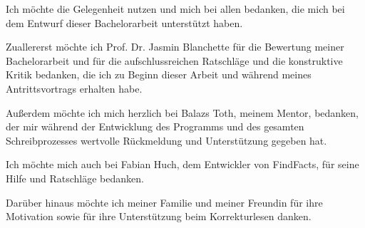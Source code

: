 \thispagestyle{empty}

\vspace*{20mm}

\begin{center}
\makeatletter

{}
{}
\makeatother
\end{center}

\vspace{10mm}
Ich möchte die Gelegenheit nutzen und mich bei allen bedanken, die mich bei dem Entwurf dieser Bachelorarbeit unterstützt haben.

Zuallererst möchte ich Prof. Dr. Jasmin Blanchette für die Bewertung meiner Bachelorarbeit und für die aufschlussreichen Ratschläge und die konstruktive Kritik bedanken, die ich zu Beginn dieser Arbeit und während meines Antrittsvortrags erhalten habe.

Außerdem möchte ich mich herzlich bei Balazs Toth, meinem Mentor, bedanken, der mir während der Entwicklung des Programms und des gesamten Schreibprozesses wertvolle Rückmeldung und Unterstützung gegeben hat.

Ich möchte mich auch bei Fabian Huch, dem Entwickler von FindFacts, für seine Hilfe und Ratschläge bedanken.

Darüber hinaus möchte ich meiner Familie und meiner Freundin für ihre Motivation sowie für ihre Unterstützung beim Korrekturlesen danken.
\cleardoublepage{}
